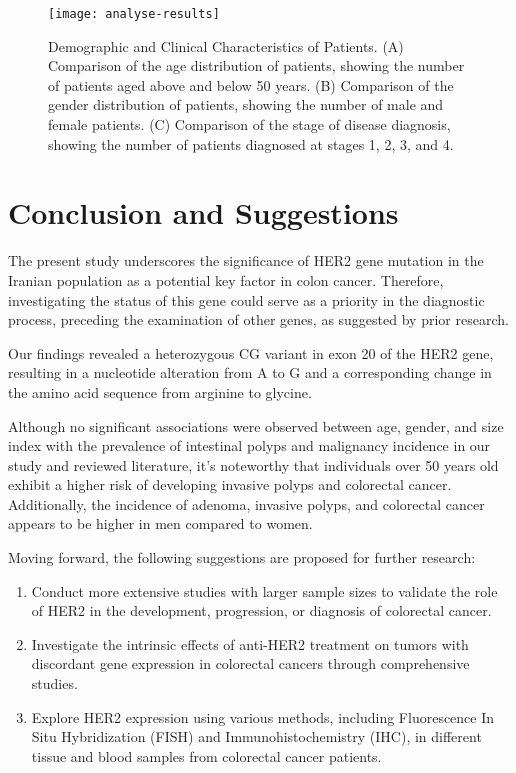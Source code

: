 \documentclass[12pt]{article}
\begin{document}
\begin{figure}[htbp]
\texttt{[image: analyse-results]}\\
\caption{Demographic and Clinical Characteristics of Patients. (A) Comparison of the age distribution of patients, showing the number of patients aged above and below 50 years. (B) Comparison of the gender distribution of patients, showing the number of male and female patients. (C) Comparison of the stage of disease diagnosis, showing the number of patients diagnosed at stages 1, 2, 3, and 4.}
\end{figure}


\section{Conclusion and Suggestions}
The present study underscores the significance of HER2 gene mutation in the Iranian population as a potential key factor in colon cancer. Therefore, investigating the status of this gene could serve as a priority in the diagnostic process, preceding the examination of other genes, as suggested by prior research. 

Our findings revealed a heterozygous CG variant in exon 20 of the HER2 gene, resulting in a nucleotide alteration from A to G and a corresponding change in the amino acid sequence from arginine to glycine.

Although no significant associations were observed between age, gender, and size index with the prevalence of intestinal polyps and malignancy incidence in our study and reviewed literature, it's noteworthy that individuals over 50 years old exhibit a higher risk of developing invasive polyps and colorectal cancer. Additionally, the incidence of adenoma, invasive polyps, and colorectal cancer appears to be higher in men compared to women.

Moving forward, the following suggestions are proposed for further research:

\begin{enumerate}
    \item Conduct more extensive studies with larger sample sizes to validate the role of HER2 in the development, progression, or diagnosis of colorectal cancer.
    \item Investigate the intrinsic effects of anti-HER2 treatment on tumors with discordant gene expression in colorectal cancers through comprehensive studies.
    \item Explore HER2 expression using various methods, including Fluorescence In Situ Hybridization (FISH) and Immunohistochemistry (IHC), in different tissue and blood samples from colorectal cancer patients.
\end{enumerate}
\end{document}
